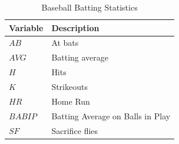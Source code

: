\begin{table}[htbp]
  \caption{Baseball Batting Statistics}
  \label{tab:discription} 
  \centering
  \begin{tabular}{|l|l|}
     \hline
     \textbf{Variable} & \textbf{Description}\\
     \hline
     $AB$ & At bats\\
     $AVG$ & Batting average\\
     $H$ & Hits\\
     $K$ & Strikeouts\\
     $HR$ & Home Run\\
     $BABIP$ & Batting Average on Balls in Play\\
     $SF$ & Sacrifice flies\\
    \hline
  \end{tabular}
\end{table}